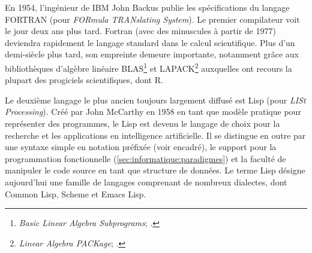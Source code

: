 En 1954, l'ingénieur de IBM John Backus publie les spécifications du
langage FORTRAN (pour \emph{FORmula TRANslating System}). Le premier
compilateur voit le jour deux ans plus tard. Fortran (avec des
minuscules à partir de 1977) deviendra rapidement le langage standard
dans le calcul scientifique. Plus d'un demi-siècle plus tard, son
empreinte demeure importante, notamment grâce aux bibliothèques
d'algèbre linéaire BLAS\footnote{%
  \emph{Basic Linear Algebra Subprograms};
  .} %
et LAPACK\footnote{%
  \emph{Linear Algebra PACKage};
  .} %
auxquelles ont recours la plupart des progiciels scientifiques, dont
R.

\begin{figure}[t]
\end{figure}

Le deuxième langage le plus ancien toujours largement diffusé est Lisp
(pour \emph{LISt Processing}). Créé par John McCarthy en 1958 en tant
que modèle pratique pour représenter des programmes, le Lisp est
devenu le langage de choix pour la recherche et les applications en
intelligence artificielle. Il se distingue en outre par une syntaxe
simple en notation préfixée (voir encadré), le support pour la
programmation fonctionnelle (\autoref{sec:informatique:paradigmes}) et
la faculté de manipuler le code source en tant que structure de
données. Le terme Lisp désigne aujourd'hui une famille de langages
comprenant de nombreux dialectes, dont Common Lisp, Scheme et Emacs
Lisp.

